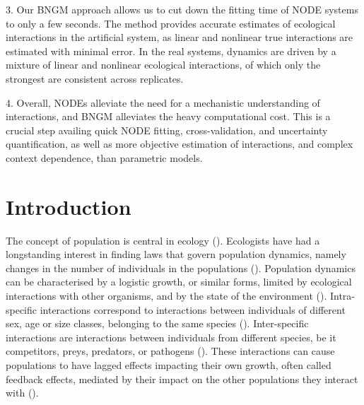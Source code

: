 \documentclass[11pt, oneside]{article}
\begin{document}
3. Our BNGM approach allows us to cut down the fitting time of NODE systems to only a few seconds.
The method provides accurate estimates of ecological interactions in the artificial system, as linear and nonlinear true interactions are estimated with minimal error.
In the real systems, dynamics are driven by a mixture of linear and nonlinear ecological interactions, of which only the strongest are consistent across replicates.

4. Overall, NODEs alleviate the need for a mechanistic understanding of interactions, and BNGM alleviates the heavy computational cost. 
This is a crucial step availing quick NODE fitting, cross-validation, and uncertainty quantification, as well as more objective estimation of interactions, and complex context dependence, than parametric models. 

\newpage
{}
\setcounter{page}{1}
\linenumbers
{}

\section{Introduction}

The concept of population is central in ecology (\cite{Berryman2002}).
Ecologists have had a longstanding interest in finding laws that govern population dynamics, namely changes in the number of individuals in the populations (\cite{Lawton1999,Turchin1999a}).
Population dynamics can be characterised by a logistic growth, or similar forms, limited by ecological interactions with other organisms, and by the state of the environment (\cite{Turchin2001c,Berryman2003}).
Intra-specific interactions correspond to interactions between individuals of different sex, age or size classes, belonging to the same species (\cite{Turchin2001c}).
Inter-specific interactions are interactions between individuals from different species, be it competitors, preys, predators, or pathogens (\cite{Turchin2001c,Berryman2003}).
These interactions can cause populations to have lagged effects impacting their own growth, often called feedback effects, mediated by their impact on the other populations they interact with (\cite{Berryman1997}).
\end{document}
